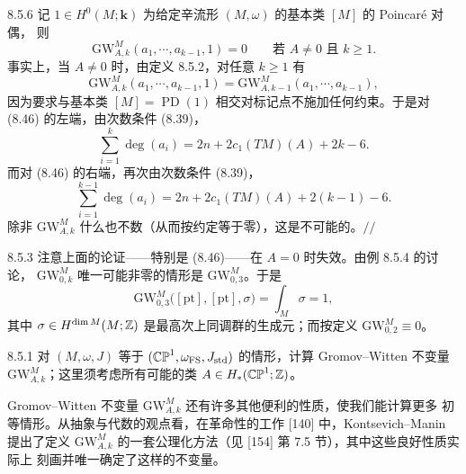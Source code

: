 \begin{wexam}{8.5.6}
记 $1\in H^0(M;\mathbf{k})$ 为给定辛流形 $(M,\omega)$ 的基本类 $[M]$ 的 Poincaré 对偶，
则
\begin{equation}
  \mathrm{GW}^M_{A,k}(a_1,\cdots,a_{k-1},1)=0
  \qquad\text{若 } A\ne0 \text{ 且 } k\ge1 .
  \tag{8.45}
\end{equation}
事实上，当 $A\ne0$ 时，由定义 8.5.2，对任意 $k\ge1$ 有
\begin{equation}
  \mathrm{GW}^M_{A,k}(a_1,\cdots,a_{k-1},1)
  =\mathrm{GW}^M_{A,k-1}(a_1,\cdots,a_{k-1}),
  \tag{8.46}
\end{equation}
因为要求与基本类 $[M]=\operatorname{PD}(1)$ 相交对标记点不施加任何约束。于是对 (8.46)
的左端，由次数条件 (8.39)，
\[
  \sum_{i=1}^k\deg(a_i)=2n+2c_1(TM)(A)+2k-6 .
\]
而对 (8.46) 的右端，再次由次数条件 (8.39)，
\[
  \sum_{i=1}^{k-1}\deg(a_i)=2n+2c_1(TM)(A)+2(k-1)-6 .
\]
除非 $\mathrm{GW}^M_{A,k}$ 什么也不数（从而按约定等于零），这是不可能的。\hspace*{\fill}$//$
\end{wexam}

\begin{wrem}{8.5.3}
注意上面的论证——特别是 (8.46)——在 $A=0$ 时失效。由例 8.5.4 的讨论，
$\mathrm{GW}^M_{0,k}$ 唯一可能非零的情形是 $\mathrm{GW}^M_{0,3}$。于是
\[
  \mathrm{GW}^M_{0,3}\big([\mathrm{pt}],[\mathrm{pt}],\sigma\big)
  =\int_M\sigma=1,
\]
其中 $\sigma\in H^{\dim M}(M;\mathbb{Z})$ 是最高次上同调群的生成元；而按定义
$\mathrm{GW}^M_{0,2}\equiv0$。
\end{wrem}

\begin{wexer}{8.5.1}
对 $(M,\omega,J)$ 等于 $(\mathbb{CP}^1,\omega_{\mathrm{FS}},J_{\mathrm{std}})$ 的情形，计算
Gromov--Witten 不变量 $\mathrm{GW}^M_{A,k}$；这里须考虑所有可能的类
$A\in H_*(\mathbb{CP}^1;\mathbb{Z})$。
\end{wexer}

Gromov--Witten 不变量 $\mathrm{GW}^M_{A,k}$ 还有许多其他便利的性质，使我们能计算更多
初等情形。从抽象与代数的观点看，在革命性的工作 [140] 中，Kontsevich--Manin 提出了定义
$\mathrm{GW}^M_{A,k}$ 的一套公理化方法（见 [154] 第 7.5 节），其中这些良好性质实际上
刻画并唯一确定了这样的不变量。
